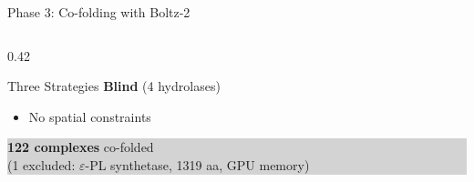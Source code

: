 \documentclass[aspectratio=169, 11pt]{beamer}
\begin{document}
\begin{frame}{Phase 3: Co-folding with Boltz-2}
\begin{columns}[T]
\begin{column}{0.42\textwidth}
\begin{exampleblock}{Three Strategies}
\vspace{2pt}
\textbf{Blind} {\small (4 hydrolases)}
\begin{itemize}\scriptsize
\item No spatial constraints
\end{itemize}
\end{exampleblock}

\vspace{2pt}
\colorbox{lightgray}{\parbox{0.92\textwidth}{\centering\small
\textbf{122 complexes} co-folded\\(1 excluded: $\varepsilon$-PL synthetase, 1319 aa, GPU memory)
}}
\end{column}
\end{columns}
\end{frame}

\end{document}
